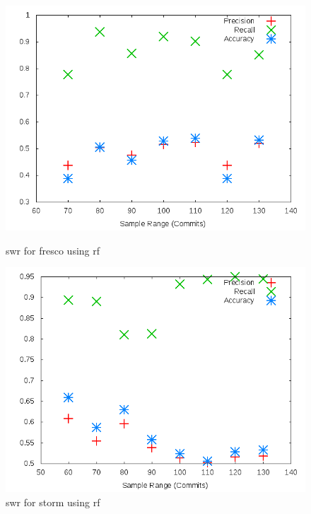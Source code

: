 \begin{figure}[h]
    \centering

    \begin{minipage}[b]{0.45\linewidth}
        \includegraphics[width=1.0\textwidth]{images/rf/test_1/fresco_sample_range}
        \caption{\gls{swr} for fresco using \gls{rf}}
        \label{fig:test_1_fresco_rf}
    \end{minipage}
\quad
    \begin{minipage}[b]{0.45\linewidth}
        \includegraphics[width=1.0\textwidth]{images/rf/test_1/storm_sample_range}
        \caption{\gls{swr} for storm using \gls{rf}}
        \label{fig:test_1_storm_rf}
    \end{minipage}
\end{figure}

